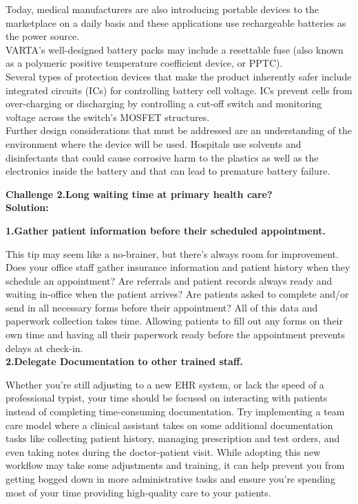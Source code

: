 \documentclass[12]{article}
\begin{document}
		 Today, medical manufacturers are also introducing portable devices to the marketplace on a daily basis and these applications use rechargeable batteries as the power source.\\
		 VARTA's well-designed battery packs may include a resettable fuse (also known as a polymeric positive temperature coefficient device, or PPTC). \\
		 Several types of protection devices that make the product inherently safer include integrated circuits (ICs) for controlling battery cell voltage. ICs prevent cells from over-charging or discharging by controlling a cut-off switch and monitoring voltage across the switch's MOSFET structures.\\
		 Further design considerations that must be addressed are an understanding of the environment where the device will be used. Hospitals use solvents and disinfectants that could cause corrosive harm to the plastics as well as the electronics inside the battery and that can lead to premature battery failure.\\
		 \begin{flushleft}
		 \hspace{-0.7cm}\textbf{Challenge 2.Long waiting time at primary health care?}\\
		 \hspace{-0.7cm}	\textbf{Solution:}	
		 \end{flushleft}
		 
		 \textbf{1.Gather patient information before their scheduled appointment.\\}
		 
		 This tip may seem like a no-brainer, but there’s always room for improvement. Does your office staff gather insurance information and patient history when they schedule an appointment? Are referrals and patient records always ready and waiting in-office when the patient arrives? Are patients asked to complete and/or send in all necessary forms before their appointment? All of this data and paperwork collection takes time. Allowing patients to fill out any forms on their own time and having all their paperwork ready before the appointment prevents delays at check-in.\\
		 
		 \textbf{2.Delegate Documentation to other trained staff.\\}
		 
		 Whether you’re still adjusting to a new EHR system, or lack the speed of a professional typist, your time should be focused on interacting with patients instead of completing time-consuming documentation. Try implementing a team care model where a clinical assistant takes on some additional documentation tasks like collecting patient history, managing prescription and test orders, and even taking notes during the doctor-patient visit. While adopting this new workflow may take some adjustments and training, it can help prevent you from getting bogged down in more administrative tasks and ensure you’re spending most of your time providing high-quality care to your patients.\\
		 
\end{document}
